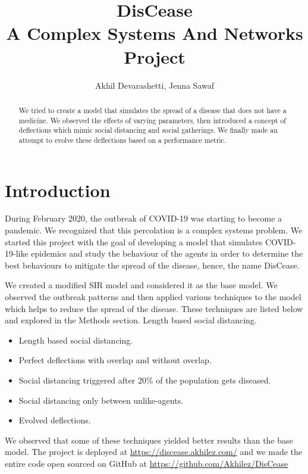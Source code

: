 \documentclass[a4paper,11pt]{article}
\title{DisCease\\A Complex Systems And Networks Project}
\author{Akhil Devarashetti, Jenna Sawaf}
\begin{document}
    \maketitle

    \begin{abstract}
        We tried to create a model that simulates the spread of a disease that does not have a medicine.
        We observed the effects of varying parameters, then introduced a concept of deflections which mimic social distancing and social gatherings.
        We finally made an attempt to evolve these deflections based on a performance metric.
    \end{abstract}

    \section{Introduction}\label{sec:introduction}
    During February 2020, the outbreak of COVID-19 was starting to become a pandemic.
    We recognized that this percolation is a complex systems problem.
    We started this project with the goal of developing a model that simulates COVID-19-like epidemics and study the behaviour of the agents in order to determine the best behaviours to mitigate the spread of the disease, hence, the name DisCease.

    We created a modified SIR model\cite{herdImm} and considered it as the base model.
    We observed the outbreak patterns and then applied various techniques to the model which helps to reduce the spread of the disease.
    These techniques are listed below and explored in the Methods section.
    Length based social distancing.

    \begin{itemize}
        \item Length based social distancing.
        \item Perfect deflections with overlap and without overlap.
        \item Social distancing triggered after 20\% of the population gets diseased.
        \item Social distancing only between unlike-agents.
        \item Evolved deflections.
    \end{itemize}

    We observed that some of these techniques yielded better results than the base model.
    The project is deployed at \url{https://discease.akhilez.com/} and we made the entire code open sourced on GitHub at \url{https://github.com/Akhilez/DisCease}
\end{document}

